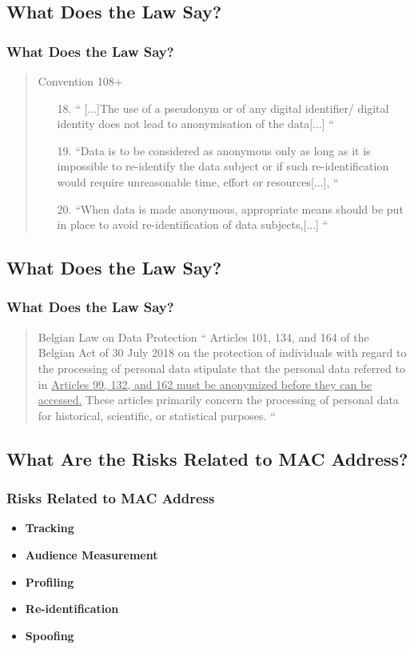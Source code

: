 \documentclass[
english,
svgnames,
notes=hide,
12pt]{beamer}
\begin{document}
\begin{frame}
  \section{What Does the Law Say?}
  \frametitle{What Does the Law Say?}
  \begin{quote}
    \begin{block}{Convention 108+}
    \begin{enumerate}
      \item[18.] ``
    [...]{The use of a pseudonym or of any digital identifier/
    digital identity does not lead to anonymisation of 
  the data}[...]
    ``
  \item[19.] ``{Data is to be considered as anonymous only as
    long as it is impossible to re-identify the data subject
    or if such re-identification would require unreasonable
  time, effort or resources}[...], 
    ``
  \item[20.] ``When data is made anonymous, appropriate
    means should be put in place to avoid re-identification
  of data subjects,[...]
    ``
    \end{enumerate}
    \end{block}
  \end{quote}
\end{frame}

\begin{frame}
  \section{What Does the Law Say?}
  \frametitle{What Does the Law Say?}
  \begin{quote}
    \begin{block}{Belgian Law on Data Protection}
  ``
  Articles 101, 134, and 164 of the Belgian Act of 30 July 2018 on the protection
  of individuals with regard to the processing of personal data
  stipulate that the personal data referred to in
  \ul{Articles 99, 132, and 162 must be anonymized before they can be accessed.} 
  These articles primarily concern the processing of personal data for historical, 
  scientific, or statistical purposes.
  ``
  \end{block}
  \end{quote}
\end{frame}

\begin{frame}
  \section{What Are the Risks Related to MAC Address?}
  \frametitle{Risks Related to MAC Address}
  \begin{itemize}
    \item \textbf{Tracking} \pause
    \item \textbf{Audience Measurement} \pause
    \item \textbf{Profiling} \pause
    \item \textbf{Re-identification} \pause
    \item \textbf{Spoofing} 
  \end{itemize}
\end{frame}
\end{document}
